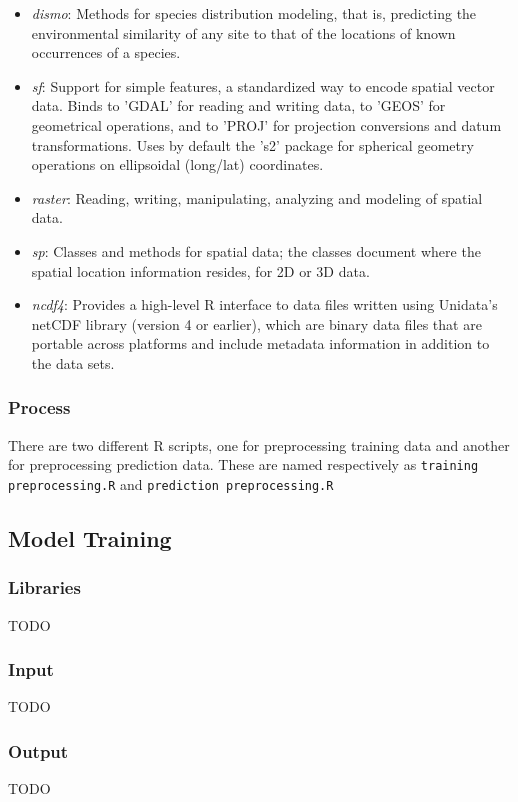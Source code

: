 \documentclass{article}
\begin{document}
\begin{itemize}
	\item \textit{dismo}: Methods for species distribution modeling, that is, predicting the environmental similarity of any site to that of the locations of known occurrences of a species.
	\item \textit{sf}: Support for simple features, a standardized way to encode spatial vector data. Binds to 'GDAL' for reading and writing data, to 'GEOS' for geometrical operations, and to 'PROJ' for projection conversions and datum transformations. Uses by default the 's2' package for spherical geometry operations on ellipsoidal (long/lat) coordinates.
	\item \textit{raster}: Reading, writing, manipulating, analyzing and modeling of spatial data. 
	\item \textit{sp}: Classes and methods for spatial data; the classes document where the spatial location information resides, for 2D or 3D data.
	\item \textit{ncdf4}: Provides a high-level R interface to data files written using Unidata's netCDF library (version 4 or earlier), which are binary data files that are portable across platforms and include metadata information in addition to the data sets.
\end{itemize}

\subsubsection*{Process}

There are two different R scripts, one for preprocessing training data and another for preprocessing prediction data. These are named respectively as \texttt{training preprocessing.R} and \texttt{prediction preprocessing.R}

\subsection{Model Training}

\subsubsection*{Libraries}
TODO

\subsubsection*{Input}
TODO

\subsubsection*{Output}
TODO
\end{document}
